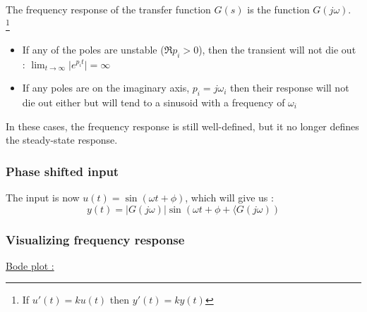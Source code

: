 \documentclass[../main.tex]{subfiles}
\begin{document}
The frequency response of the transfer function $G(s)$ is the function $G(j\omega)$.\\
\footnote{If $u'(t) = k u(t)$ then $y'(t) = k y(t)$}
\begin{itemize}
    \item If any of the poles are unstable ($\Re p_i>0$), then the transient will not die out : $\lim_{t\rightarrow\infty} \lvert e^{p_it} \rvert = \infty$\\
    \item If any poles are on the imaginary axis, $p_i = j\omega_i$ then their response will not die out either but will tend to a sinusoid with a frequency of $\omega_i$\\
\end{itemize}
In these cases, the frequency response is still well-defined, but it no longer defines the steady-state response.\\

\subsubsection{Phase shifted input}
The input is now $u(t) = \sin(\omega t+ \phi)$, which will give us : \begin{equation}
    y(t) = \lvert G(j\omega)\rvert \sin(\omega t + \phi + \langle G(j\omega))
\end{equation}

\subsubsection{Visualizing frequency response}
\quad \underline{Bode plot :}\\
\end{document}
